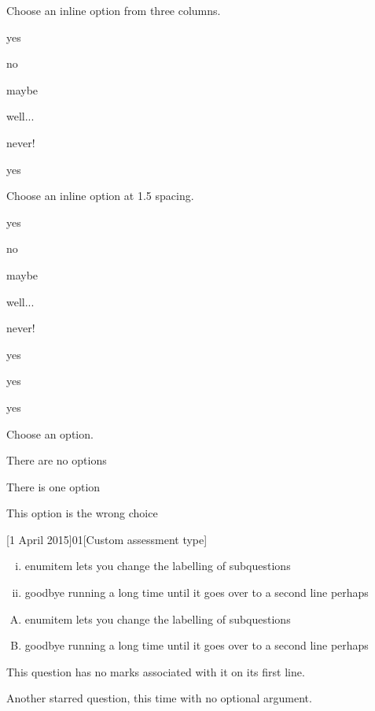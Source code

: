 \documentclass{ouab}
\begin{document}
Choose an inline option from three columns.

\begin{inlineoptions}{3} %
\item yes
\item no
\item maybe
\item well...
\item never!
\item yes
\end{inlineoptions}

\question
Choose an inline option at 1.5 spacing.
\begin{inlineoptions}[1.5]{3} %
\item yes
\item no
\item maybe
\item well...
\item never!
\item yes
\item yes
\item yes
\noitem %
\end{inlineoptions}

Choose an option.
\begin{options}
\item There are no options
\item There is one option
\item This option is the wrong choice
\end{options}


[1 April 2015]{01}[Custom assessment type]

\begin{enumerate}[(i)]
\item enumitem lets you change the labelling of subquestions
\item goodbye running a long time until it goes over to a second line perhaps
\end{enumerate}

\begin{enumerate}[(A)]
\item enumitem lets you change the labelling of subquestions
\item goodbye running a long time until it goes over to a second line perhaps
\end{enumerate}

This question has no marks associated with it on its first line.

\question*
Another starred question, this time with no optional argument.
\end{document}
